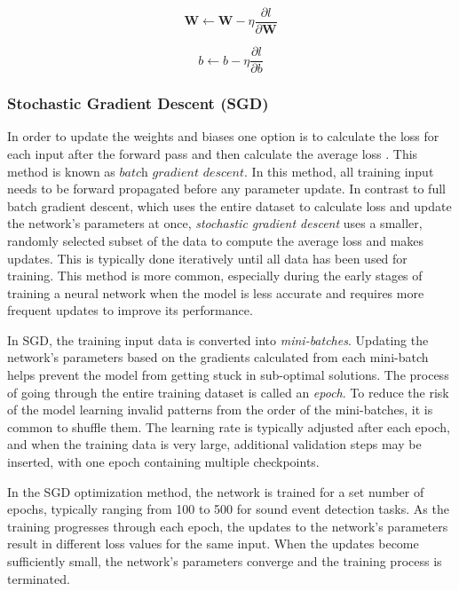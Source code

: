   \begin{equation}
     \label{gradient6}
         \textbf{W} \leftarrow \textbf{W} - \eta \frac{\partial l}{\partial \textbf{W}}
 \end{equation}


 \begin{equation}
     \label{gradient7}
     b  \leftarrow b - \eta \frac{\partial l}{\partial b}
 \end{equation}


 \subsubsection{Stochastic Gradient Descent (SGD)}
 In order to update the weights and biases one option is to calculate the loss for each input after the forward pass and then calculate the average loss \cite{Goodfellow-et-al-2016}.  This method is known as $\textit{batch gradient descent}$. In this method, all training input needs to be forward propagated before any parameter update. In contrast to full batch gradient descent, which uses the entire dataset to calculate loss and update the network's parameters at once, \textit{stochastic gradient descent} uses a smaller, randomly selected subset of the data to compute the average loss and makes updates. This is typically done iteratively until all data has been used for training. This method is more common, especially during the early stages of training a neural network when the model is less accurate and requires more frequent updates to improve its performance. 
 
 In SGD, the training input data is converted into \textit{mini-batches}. Updating the network's parameters based on the gradients calculated from each mini-batch helps prevent the model from getting stuck in sub-optimal solutions. The process of going through the entire training dataset is called an \textit{epoch}. To reduce the risk of the model learning invalid patterns from the order of the mini-batches, it is common to shuffle them. The learning rate is typically adjusted after each epoch, and when the training data is very large, additional validation steps may be inserted, with one epoch containing multiple checkpoints.

 In the SGD optimization method, the network is trained for a set number of epochs, typically ranging from 100 to 500 for sound event detection tasks. As the training progresses through each epoch, the updates to the network's parameters result in different loss values for the same input. When the updates become sufficiently small, the network's parameters converge and the training process is terminated.

